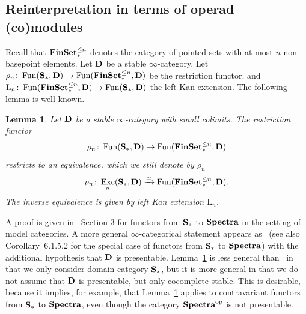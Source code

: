 \documentclass[psamsfonts]{amsart}
\theoremstyle{plain}
\newtheorem{lem}[thm]{Lemma}
\theoremstyle{definition}
\theoremstyle{remark}
\newcommand{\catname}[1]{{\normalfont\textbf{#1}}}
\newcommand{\op}{{\mathrm{op}}}
\newcommand{\finset}{\catname{FinSet}_*}
\newcommand{\spaces}{\catname{S}_*}
\newcommand{\lkan}{\mathrm{L}}
\DeclareMathOperator{\fun}{Fun}
\DeclareMathOperator{\exc}{Exc}
\begin{document}
\subsection*{Reinterpretation in terms of operad (co)modules}
Recall that $\finset^{\le n}$ denotes the category of pointed sets with at most $n$ non-basepoint elements. Let $\catname{D}$ be a stable $\infty$-category. Let $\rho_n\colon\fun(\spaces, \catname{D})\to \fun(\finset^{\le n}, \catname{D})$ be the restriction functor. 
and $\lkan_n\colon\fun(\finset^{\le n}, \catname{D}) \to \fun(\spaces, \catname{D})$ the left Kan extension. 
The following lemma is well-known. 
\begin{lem}\label{lem: excisive finset}
Let $\catname{D}$ be a stable $\infty$-category with small colimits. The restriction functor   
\[
\rho_n\colon\fun(\spaces, \catname{D})\to \fun(\finset^{\le n}, \catname{D})
\]
restricts to an equivalence, which we still denote by $\rho_n$
\[
\rho_n\colon\exc_n(\spaces, \catname{D})\xrightarrow{\simeq} \fun(\finset^{\le n}, \catname{D}).
\]
The inverse equivalence is given by left Kan extension $\lkan_n$.
\end{lem}
A proof is given in~\cite{Arone-Ching_Cross-effects} Section 3 for functors from $\spaces$ to $\catname{Spectra}$ in the setting of model categories. A more general $\infty$-categorical statement appears as~\cite[Corollary 6.1.5.7]{LurieHA} (see also Corollary~6.1.5.2 for the special case of functors from $\spaces$ to $\catname{Spectra}$) with the additional hypothesis that $\catname{D}$ is presentable. Lemma~\ref{lem: excisive finset} is less general than~\cite[Corollary 6.1.5.7]{LurieHA} in that we only consider domain category $\spaces$, but it is more general in that we do not assume that $\catname{D}$ is presentable, but only cocomplete stable. This is desirable, because it implies, for example, that Lemma~\ref{lem: excisive finset} applies to contravariant functors from $\spaces$ to $\catname{Spectra}$, even though the category ${\catname{Spectra}}^{\op}$ is not presentable.
\end{document}

